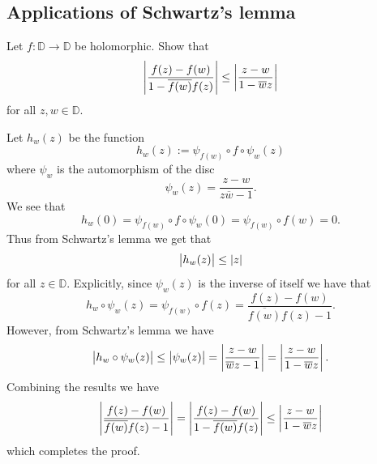 \documentclass[11pt,a4paper]{article}
\begin{document}
\subsection{Applications of Schwartz's lemma}
\begin{exercise}
  Let $f \colon \mathbb D \to \mathbb D$ be holomorphic.
  Show that
  \[
    \abs{\frac{f(z) - f(w)}{1 - \overline{f(w)} f(z)}} \le
    \abs{\frac{z - w}{1 - \overline w z}} %
  \]
  for all $z,w \in \mathbb D$.
\end{exercise}
\begin{solution}
  Let $h_{w}(z)$ be the function
  \[
    h_w(z) := \psi_{f(w)} \circ f \circ \psi_{w}(z)
  \]
  where $\psi_{w}$ is the automorphism of the disc
  \[
    \psi_{w}(z) = \frac{z - w}{z \overline w - 1}.
  \]
  We see that
  \[
    h_w(0) =
    \psi_{f(w)} \circ f \circ \psi_{w}(0) =
    \psi_{f(w)} \circ f(w) = 0.
  \]
  Thus from Schwartz's lemma we get that
  \[
    \left\lvert h_w(z)\right\rvert \le \left\lvert z\right\rvert
  \]
  for all $z \in \mathbb D$.
  Explicitly, since $\psi_w(z)$ is the inverse of itself we have that
  \[
    h_w \circ \psi_w(z) =
    \psi_{f(w)} \circ f(z) =
    \frac{f(z) - f(w)}{\overline{f(w)} f(z) - 1}.
  \]
  However, from Schwartz's lemma we have
  \[
    \left\lvert h_w \circ \psi_w(z)\right\rvert \le
    \left\lvert\psi_w(z)\right\rvert =
    \left\lvert\frac{z - w}{\overline w z - 1}\right\rvert =
    \left\lvert\frac{z - w}{1 - \overline w z}\right\rvert.
  \]
  Combining the results we have
  \[
    \left\lvert\frac{f(z) - f(w)}{\overline{f(w)} f(z) - 1}\right\rvert =
    \left\lvert\frac{f(z) - f(w)}{1 - \overline{f(w)} f(z)}\right\rvert \le
    \left\lvert\frac{z - w}{1 - \overline w z}\right\rvert
  \]
  which completes the proof.
\end{solution}
\end{document}
